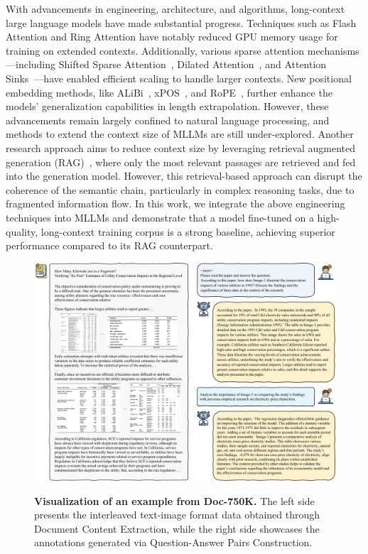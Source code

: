 \documentclass[10pt,twocolumn,letterpaper]{article}
\def\dataname{Doc-750K\xspace}
\begin{document}
\begin{CJK}{UTF8}{gbsn}
With advancements in engineering, architecture, and algorithms, long-context large language models have made substantial progress. Techniques such as Flash Attention \cite{dao2022flashattention,dao2023flashattention} and Ring Attention \cite{liu2023ring} have notably reduced GPU memory usage for training on extended contexts. Additionally, various sparse attention mechanisms—including Shifted Sparse Attention~\cite{chen2023longlora}, Dilated Attention~\cite{ding2023longnet}, and Attention Sinks~\cite{han2023lm,xiao2023efficient}—have enabled efficient scaling to handle larger contexts. 
New positional embedding methods, like ALiBi~\cite{press2021train}, xPOS~\cite{sun2022length}, and RoPE~\cite{su2024roformer}, further enhance the models’ generalization capabilities in length extrapolation.
However, these advancements remain largely confined to natural language processing, and methods to extend the context size of MLLMs are still under-explored.
Another research approach aims to reduce context size by leveraging retrieval augmented generation (RAG)~\cite{yu2024visrag,faysse2024colpali, cho2024m3docrag}, where only the most relevant passages are retrieved and fed into the generation model. However, this retrieval-based approach can disrupt the coherence of the semantic chain, particularly in complex reasoning tasks, due to fragmented information flow.
In this work, we integrate the above engineering techniques into MLLMs and demonstrate that a model fine-tuned on a high-quality, long-context training corpus is a strong baseline, achieving superior performance compared to its RAG counterpart.


\begin{figure}[t!]
    \centering
    {\includegraphics[width=\linewidth]{figure/example.pdf}}
    \caption{\textbf{Visualization of an example from {\dataname}.} The left side presents the interleaved text-image format data obtained through Document Content Extraction, while the right side showcases the annotations generated via Question-Answer Pairs Construction.}
    \label{fig:data_example}
    \vspace{-3mm}
\end{figure}



\end{CJK}
\end{document}

